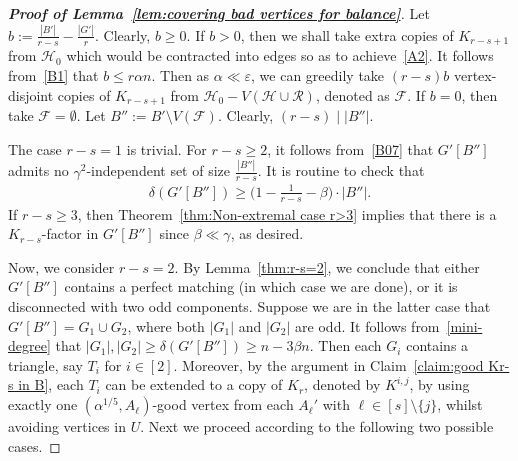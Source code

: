 \documentclass[11pt, a4paper]{article}
\theoremstyle{definition}
\newcommand{\eps}{\varepsilon}
\newcommand{\<}{\subseteq}
\newcommand{\de}{\delta}
\begin{document}
\begin{proof}[{\bf Proof of Lemma~\ref{lem:covering bad vertices for balance}}]

Let $b:=\frac{|B'|}{r-s}- \frac{|G'|}{r}$. Clearly, $b\geq 0$. If $b>0$, then we shall take extra copies of $K_{r-s+1}$ from $\mathcal{H}_0$ which would be contracted into edges so as to achieve~\ref{A2}. It follows from~\ref{B1} that $b\leq r\alpha n$.  
Then as $\alpha \ll \eps$, we can greedily take $(r-s)b$ vertex-disjoint copies of $K_{r-s+1}$ from $\mathcal{H}_0-V(\mathcal{H}\cup \mathcal{R})$, denoted as $\mathcal{F}$. If $b= 0$, then take $\mathcal{F}=\emptyset$. Let $B'':=B'\setminus V(\mathcal{F})$. Clearly, $(r-s)\mid |B''|$. 



\medskip
{} 

The case $r-s=1$ is trivial. For $r-s\ge 2$, it follows from~\ref{B07} that $G'[B'']$ admits no ${\gamma}^2$-independent set of size $\frac{|B''|}{r-s}$. It is routine to check that 
\begin{align}\label{mini-degree}  \de(G'[B''])\ge \Big(1-\frac{1}{r-s}-\beta\Big)\cdot|B''|.
\end{align}
If $r-s\ge 3$, then Theorem~\ref{thm:Non-extremal case r>3} implies that there is a $K_{r-s}$-factor in $G'[B'']$ {since $\beta\ll\gamma$}, as desired.

Now, we consider \( r - s = 2 \). By Lemma~\ref{thm:r-s=2}, we conclude that either \(G'[B'']\) contains a perfect matching (in which case we are done), or it is disconnected with two odd components. %
Suppose we are in the latter case that $G'[B'']=G_1\cup G_2$, where both $|G_1|$ and $|G_2|$ are odd. It follows from~\eqref{mini-degree} that $|G_1|,|G_2|\geq \delta(G'[B''])\geq n-3\beta n$. Then each $G_i$ contains a triangle, say $T_i$ for $i\in [2]$.
Moreover,  by the argument in Claim~\ref{claim:good Kr-s in B}, each $T_i$ can be extended to a copy of \(K_r\), denoted by {\(K^{i,j}\)}, by using exactly one $(\alpha^{1/5},A_\ell)$-good vertex from each \({A_{\ell}'}\) with {\(\ell \in [s]\setminus\{j\}\)}, whilst avoiding vertices in ${U}$. Next we proceed according to the following two possible cases. 


\end{proof}
\end{document}
